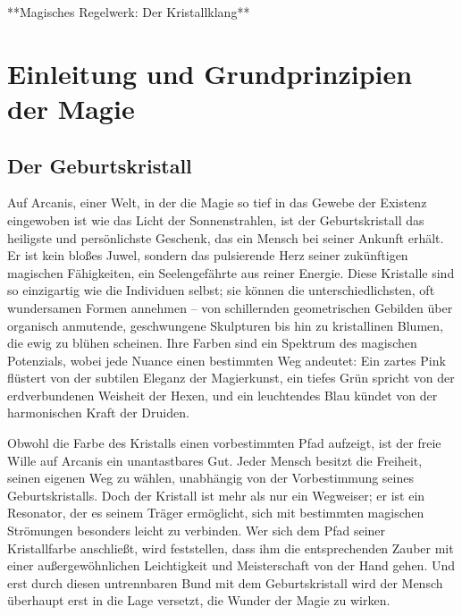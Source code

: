 \documentclass[10pt,a4paper,twocolumn,openany]{book}
\begin{document}
\tableofcontents

\mainmatter











**Magisches Regelwerk: Der Kristallklang**

\chapter{Einleitung und Grundprinzipien der Magie}

\section{Der Geburtskristall}

Auf Arcanis, einer Welt, in der die Magie so tief in das Gewebe der Existenz eingewoben ist wie das Licht der Sonnenstrahlen, ist der Geburtskristall das heiligste und persönlichste Geschenk, das ein Mensch bei seiner Ankunft erhält. Er ist kein bloßes Juwel, sondern das pulsierende Herz seiner zukünftigen magischen Fähigkeiten, ein Seelengefährte aus reiner Energie. Diese Kristalle sind so einzigartig wie die Individuen selbst; sie können die unterschiedlichsten, oft wundersamen Formen annehmen – von schillernden geometrischen Gebilden über organisch anmutende, geschwungene Skulpturen bis hin zu kristallinen Blumen, die ewig zu blühen scheinen. Ihre Farben sind ein Spektrum des magischen Potenzials, wobei jede Nuance einen bestimmten Weg andeutet: Ein zartes Pink flüstert von der subtilen Eleganz der Magierkunst, ein tiefes Grün spricht von der erdverbundenen Weisheit der Hexen, und ein leuchtendes Blau kündet von der harmonischen Kraft der Druiden.

Obwohl die Farbe des Kristalls einen vorbestimmten Pfad aufzeigt, ist der freie Wille auf Arcanis ein unantastbares Gut. Jeder Mensch besitzt die Freiheit, seinen eigenen Weg zu wählen, unabhängig von der Vorbestimmung seines Geburtskristalls. Doch der Kristall ist mehr als nur ein Wegweiser; er ist ein Resonator, der es seinem Träger ermöglicht, sich mit bestimmten magischen Strömungen besonders leicht zu verbinden. Wer sich dem Pfad seiner Kristallfarbe anschließt, wird feststellen, dass ihm die entsprechenden Zauber mit einer außergewöhnlichen Leichtigkeit und Meisterschaft von der Hand gehen. Und erst durch diesen untrennbaren Bund mit dem Geburtskristall wird der Mensch überhaupt erst in die Lage versetzt, die Wunder der Magie zu wirken.
\end{document}
